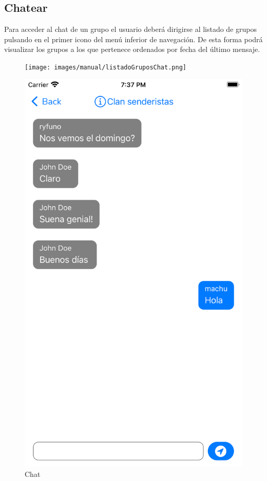 \begin{appendices}
\section{Chatear}
Para acceder al chat de un grupo el usuario deberá dirigirse al listado de grupos pulsando en el primer icono del menú inferior de navegación.
De esta forma podrá visualizar los grupos a los que pertenece ordenados por fecha del último mensaje.
\begin{figure}[H]
        \centering
        \begin{minipage}{0.3\textwidth}
            \centering
            \texttt{[image: images/manual/listadoGruposChat.png]}
        \end{minipage}
        \begin{minipage}{0.3\textwidth}
            \centering
            \includegraphics[cframe=black 2pt,width=1\linewidth]{images/manual/ejemploChat.png}
        \end{minipage}
        \caption{Chat}
        \label{fig:my_label}
\end{figure}
\end{appendices}